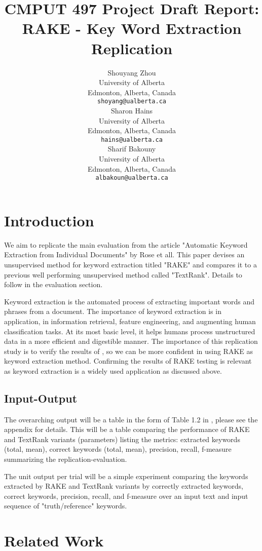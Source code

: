 \documentclass[11pt,a4paper]{article}
\title{CMPUT 497 Project Draft Report: \\ RAKE - Key Word Extraction Replication}
\author{Shouyang Zhou \\
  University of Alberta \\
  Edmonton, Alberta, Canada \\
  {\tt shoyang@ualberta.ca} \\\And
  Sharon Hains \\
  University of Alberta \\
  Edmonton, Alberta, Canada \\
  {\tt hains@ualberta.ca} \\\And
  Sharif Bakouny \\
  University of Alberta \\
  Edmonton, Alberta, Canada \\
  {\tt albakoun@ualberta.ca} \\}
\date{}
\begin{document}
\maketitle

\section{Introduction}

We aim to replicate the main evaluation from the article "Automatic Keyword Extraction from Individual Documents" by Rose et all. This paper devises an unsupervised method for keyword extraction titled "RAKE" and compares it to a previous well performing unsupervised method called "TextRank". Details to follow in the evaluation section.

Keyword extraction is the automated process of extracting important words and phrases from a document. The importance of keyword extraction is in application, in information retrieval, feature engineering, and augmenting human classification tasks. At its most basic level, it helps humans process unstructured data in a more efficient and digestible manner. The importance of this replication study is to verify the results of \citet{1}, so we can be more confident in using RAKE as keyword extraction method. Confirming the results of RAKE testing is relevant as keyword extraction is a widely used application as discussed above. 

\subsection{Input-Output}

The overarching output will be a table in the form of Table 1.2 in \citet{1}, please see the appendix for details. This will be a table comparing the performance of RAKE and TextRank variants (parameters) listing the metrics: extracted keywords (total, mean), correct keywords (total, mean), precision, recall, f-measure summarizing the replication-evaluation.

The unit output per trial will be a simple experiment comparing the keywords extracted by RAKE and TextRank variants by correctly extracted keywords, correct keywords, precision, recall, and f-measure over an input text and input sequence of "truth/reference" keywords. 

\section{Related Work}
\end{document}
